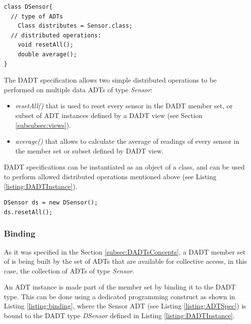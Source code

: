 \begin{lstlisting}[frame=trbl, basewidth={0.55em, 0.6em}, captionpos=b, 
basicstyle=\ttfamily\footnotesize, breaklines, caption = Data DADT 
specification (reproduced from \cite{migliavacca_DADT:2006}), label = 
listing:DADTSpec]
class DSensor{
  // type of ADTs
    Class distributes = Sensor.class;	
  // distributed operations:
	void resetAll();
	double average();
}
\end{lstlisting} 
 
The DADT specification allows two simple distributed operations to be performed
on multiple data ADTs of type \emph{Sensor}:  
\begin{itemize}
\item \emph{resetAll()} that is used to reset every sensor in the DADT member
set, or subset of ADT instances defined by a DADT view (see Section
\ref{subsubsec:views}).
\item \emph{average()} that allows to calculate the average of readings of every
sensor in the member set or subset defined by DADT view.
\end{itemize}
 
DADT specifications can be instantiated as an object of a class, and can be
used to perform allowed distributed operations mentioned above (see Listing
\ref{listing:DADTInstance}).

\begin{lstlisting}[frame=trbl, basewidth={0.55em, 0.6em}, captionpos=b, 
basicstyle=\ttfamily\footnotesize, breaklines, caption = DADT Instantiation 
(adapted from \cite{migliavacca_DADT:2006}), label = listing:DADTInstance ]
DSensor ds = new DSensor();
ds.resetAll();
\end{lstlisting}

\subsubsection{Binding}

As it was specified in the Section \ref{subsec:DADTsConcepts}, a DADT member set
of is being built by the set of ADTs that are available for collective
access, in this case, the collection of ADTs of type \emph{Sensor}.

An ADT instance is made part of the member set by binding it to the DADT type.
This can be done using a dedicated programming construct as shown in Listing
\ref{listing:binding}, where the Sensor ADT (see Listing \ref{listing:ADTSpec}) is bound to the DADT type \emph{DSensor}
defined in Listing \ref{listing:DADTInstance}. 
 
